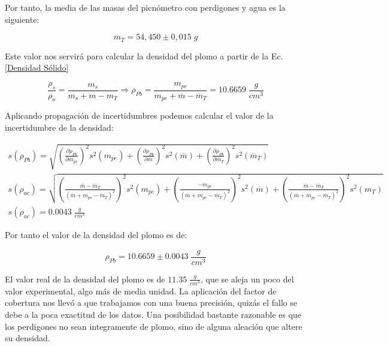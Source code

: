 \documentclass[a4paper,12pt,titlepage]{article}
\begin{document}
\newpage

Por tanto, la media de las masas del picnómetro con perdigones y agua es la siguiente:

\begin{equation}
    \overline{m}_{T}=54,450 \pm 0,015 \; g
\end{equation}

Este valor nos servirá para calcular la densidad del plomo a partir de la Ec.\ref{Densidad Sólido}

\begin{equation}
    \frac{\rho_{s}}{\rho_{o}}=\frac{m_{s}}{m_{s}+m-m_{T}} \Rightarrow \rho_{Pb} = \frac{m_{pe}}{m_{pe}+\overline{m}-\overline{m}_{T}} = 10.6659\;  \frac{g}{cm^3}
\end{equation}

Aplicando propagación de incertidumbres podemos calcular el valor de la incertidumbre de la densidad:

\begin{gather}
    s(\rho_{Pb}) = \sqrt{\left (\frac{\partial \rho_{Pb}}{\partial m_{pe}} \right )^2 s^2(m_{pe})  +  \left (\frac{\partial \rho_{Pb}}{\partial \overline{m}} \right )^2 s^2(\overline{m})  +  \left (\frac{\partial \rho_{Pb}}{\partial \overline{m}_{T}} \right )^2 s^2(\overline{m}_{T})} \\ \textstyle
    s(\rho_{ac}) =
    \sqrt{\left (\frac{\overline{m}-\overline{m}_{T}}{(\overline{m}+m_{pe}-\overline{m}_{T})^2} \right )^2 s^2(m_{pe})  +  \left (\frac{-m_{pe}}{(\overline{m}+m_{pe}-\overline{m}_{T})^2} \right )^2 s^2(\overline{m})  +  \left (\frac{\overline{m}-\overline{m}_{T}}{(\overline{m}+m_{pe}-\overline{m}_{T})^2} \right )^2 s^2(m_{T})}\nonumber  \\
    s(\rho_{ac}) = 0.0043 \; \frac{g}{cm^3} \nonumber
\end{gather}

Por tanto el valor de la densidad del plomo es de:

\begin{equation}
    \rho_{Pb} = 10.6659 \pm 0.0043 \; \frac{g}{cm^3}
\end{equation}

El valor real de la densidad del plomo es de $11.35 \; \frac{g}{cm^3}$, que se aleja un poco del valor experimental, algo más de media unidad. La aplicación del factor de cobertura nos llevó a que trabajamos con una buena precisión, quizás el fallo se debe a la poca exactitud de los datos. Una posibilidad bastante razonable es que los perdigones no sean integramente de plomo, sino de alguna aleación que altere su densidad.
\end{document}

